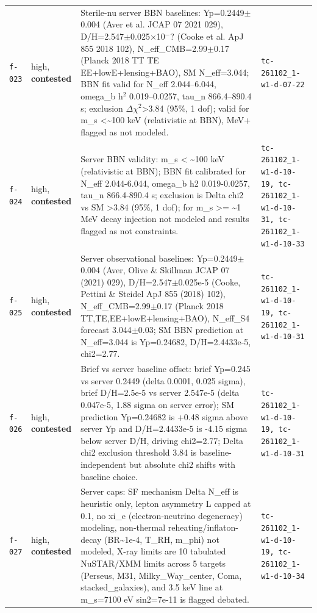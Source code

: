 \documentclass[11pt,a4paper]{article}
\begin{document}
\begin{longtable}{@{}p{}p{}p{}p{}@{}}
\texttt{f-023} & high, \textbf{contested} & Sterile-nu server BBN baselines: Yp=0.2449$\pm$0.004 (Aver et al. JCAP 07 2021 029), D/H=2.547$\pm$0.025$\times$10$^-$? (Cooke et al. ApJ 855 2018 102), N\_eff\_CMB=2.99$\pm$0.17 (Planck 2018 TT TE EE+lowE+lensing+BAO), SM N\_eff=3.044; BBN fit valid for N\_eff 2.044--6.044, omega\_b h$^2$ 0.019--0.0257, tau\_n 866.4--890.4 s; exclusion $\Delta$$\chi$$^2$\textgreater{}3.84 (95\%, 1 dof); valid for m\_s \textless{}\textasciitilde{}100 keV (relativistic at BBN), MeV+ flagged as not modeled. & \texttt{tc-261102\_\allowbreak{}1-w1-d-07-22} \\
\texttt{f-024} & high, \textbf{contested} & Server BBN validity: m\_s \textless{} \textasciitilde{}100 keV (relativistic at BBN); BBN fit calibrated for N\_eff 2.044-6.044, omega\_b h2 0.019-0.0257, tau\_n 866.4-890.4 s; exclusion is Delta chi2 vs SM \textgreater{}3.84 (95\%, 1 dof); for m\_s \textgreater{}= \textasciitilde{}1 MeV decay injection not modeled and results flagged as not constraints. & \texttt{tc-261102\_\allowbreak{}1-w1-d-10-19,\allowbreak{} tc-261102\_\allowbreak{}1-w1-d-10-31,\allowbreak{} tc-261102\_\allowbreak{}1-w1-d-10-33} \\
\texttt{f-025} & high, \textbf{contested} & Server observational baselines: Yp=0.2449$\pm$0.004 (Aver, Olive \& Skillman JCAP 07 (2021) 029), D/H=2.547$\pm$0.025e-5 (Cooke, Pettini \& Steidel ApJ 855 (2018) 102), N\_eff\_CMB=2.99$\pm$0.17 (Planck 2018 TT,TE,EE+lowE+lensing+BAO), N\_eff\_S4 forecast 3.044$\pm$0.03; SM BBN prediction at N\_eff=3.044 is Yp=0.24682, D/H=2.4433e-5, chi2=2.77. & \texttt{tc-261102\_\allowbreak{}1-w1-d-10-19,\allowbreak{} tc-261102\_\allowbreak{}1-w1-d-10-31} \\
\texttt{f-026} & high, \textbf{contested} & Brief vs server baseline offset: brief Yp=0.245 vs server 0.2449 (delta 0.0001, 0.025 sigma), brief D/H=2.5e-5 vs server 2.547e-5 (delta 0.047e-5, 1.88 sigma on server error); SM prediction Yp=0.24682 is +0.48 sigma above server Yp and D/H=2.4433e-5 is -4.15 sigma below server D/H, driving chi2=2.77; Delta chi2 exclusion threshold 3.84 is baseline-independent but absolute chi2 shifts with baseline choice. & \texttt{tc-261102\_\allowbreak{}1-w1-d-10-19,\allowbreak{} tc-261102\_\allowbreak{}1-w1-d-10-31} \\
\texttt{f-027} & high, \textbf{contested} & Server caps: SF mechanism Delta N\_eff is heuristic only, lepton asymmetry L capped at 0.1, no xi\_e (electron-neutrino degeneracy) modeling, non-thermal reheating/inflaton-decay (BR\textasciitilde{}1e-4, T\_RH, m\_phi) not modeled, X-ray limits are 10 tabulated NuSTAR/XMM limits across 5 targets (Perseus, M31, Milky\_Way\_center, Coma, stacked\_galaxies), and 3.5 keV line at m\_s=7100 eV sin2=7e-11 is flagged debated. & \texttt{tc-261102\_\allowbreak{}1-w1-d-10-19,\allowbreak{} tc-261102\_\allowbreak{}1-w1-d-10-34} \\

\end{longtable}
\end{document}

